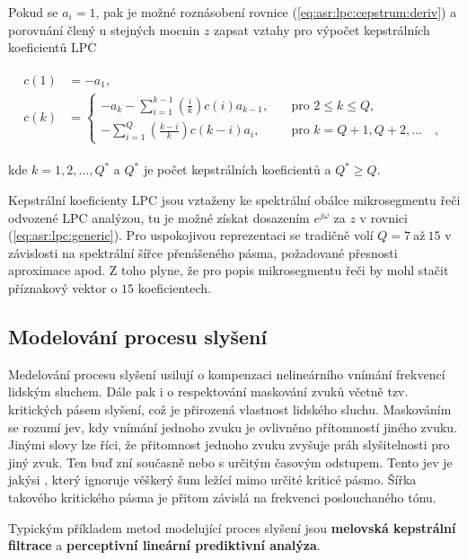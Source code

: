 \noindent Pokud se $a_i = 1$, pak je možné roznásobení rovnice (\ref{eq:asr:lpc:cepstrum:deriv}) a porovnání člený u stejných mocnin $z$ zapsat vztahy pro výpočet kepstrálních koeficientů LPC

\begin{align}
  \begin{split}
    c(1) &= -a_1, \\
    c(k) &=
    \begin{cases}
      - a_k - \sum_{i=1}^{k-1} \left(\frac{i}{k}\right) c(i) a_{k-1},  & \quad \text{pro } 2 \leq k \leq Q, \\
      - \sum_{i=1}^{Q} \left(\frac{k - i}{k}\right) c(k-i) a_i,  & \quad \text{pro } k = Q + 1, Q + 2, \dots \quad ,
    \end{cases}
  \end{split}
  \label{eq:asr:lpc:cepstrum:coef}
\end{align}

\noindent kde $k = 1, 2, \dots , Q^{*}$ a $Q^{*}$ je počet kepstrálních koeficientů a $Q^{*} \geq Q$.

Kepstrální koeficienty LPC jsou vztaženy ke spektrální obálce mikrosegmentu řeči odvozené LPC analýzou, tu je možné získat dosazením $e^{j\omega}$ za $z$ v rovnici (\ref{eq:asr:lpc:generic}). Pro uspokojivou reprezentaci se tradičně volí $Q = 7\ \text{až}\ 15$ v závislosti na spektrální šířce přenášeného pásma, požadované přesnosti aproximace apod. Z toho plyne, že pro popis mikrosegmentu řeči by mohl stačit příznakový vektor o $15$ koeficientech.

\subsection{Modelování procesu slyšení}
\label{chap:asr:parametrization:hearing}

Medelování procesu slyšení usilují o kompenzaci nelineárního vnímání frekvencí lidským sluchem. Dále pak i o respektování maskování zvuků včetně tzv. kritických pásem slyšení, což je přirozená vlastnost lidského sluchu. Maskováním se rozumí jev, kdy vnímání jednoho zvuku je ovlivněno přítomností jiného zvuku. Jinými slovy lze říci, že přitomnost jednoho zvuku zvyšuje práh slyšitelnosti pro jiný zvuk. Ten buď zní současně nebo s určitým časovým odstupem. Tento jev je jakýsi , který ignoruje věškerý šum ležící mimo určité kriticé pásmo. Šířka takového kritického pásma je přitom závislá na frekvenci poslouchaného tónu.

Typickým příkladem metod modelující proces slyšení jsou \textbf{melovská kepstrální filtrace} a \textbf{perceptivní lineární prediktivní analýza}.

